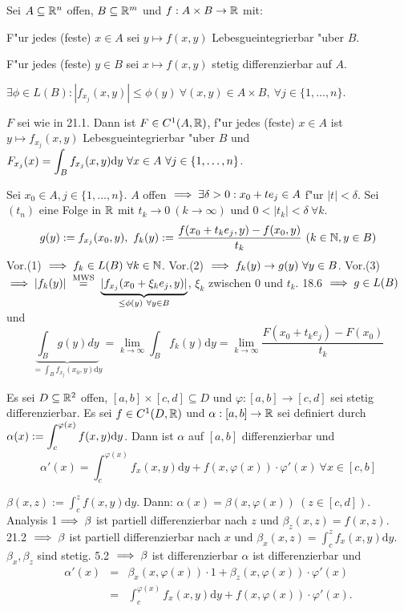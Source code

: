 \documentclass[a4paper,twoside,DIV15,BCOR12mm]{scrbook}
\begin{document}
\begin{satz}
Sei $A\subseteq \mathbb{R}^n$ offen, $B\subseteq\mathbb{R}^m$ und $f:A\times B\to\mathbb{R}$ mit:
\begin{liste}
\item F"ur jedes (feste) $x \in A$ sei $y\mapsto f(x,y)$ Lebesgueintegrierbar "uber $B$.
	\item F"ur jedes (feste) $y \in B$ sei $x\mapsto f(x,y)$ stetig differenzierbar auf $A$.
\item $\exists \phi\in L(B): |f_{x_j}(x,y)|\le\phi(y)\ \forall (x,y)\in A\times B,\ \forall j\in\{1,\ldots,n\}$.
\end{liste}
$F$ sei wie in 21.1. Dann ist $F\in C^1(A,\mathbb{R})$, f"ur jedes (feste) $x\in A$ ist $y\mapsto f_{x_j}(x,y)$ Lebesgueintegrierbar "uber $B$ und $F_{x_j}(x)=\displaystyle\int_B f_{x_j}(x,y)\text{d}y\ \forall x\in A\ \forall j\in \{1,\ldots,n\}$.
\end{satz}

\begin{beweis}
Sei $x_0\in A, j\in \{1,\ldots, n\}$. $A$ offen $\implies\exists \delta>0:x_0+te_j\in A$ f"ur $|t|<\delta$. Sei $(t_n)$ eine Folge in $\mathbb{R}$ mit $t_k\to 0\ (k\to\infty)$ und $0<|t_k|<\delta\ \forall k$.\\
\[g(y):=f_{x_j}(x_0, y),\ f_k(y):=\frac{f(x_0+t_ke_j,y)-f(x_0,y)}{t_k}\ (k\in \MdN, y\in B)\]
Vor.(1) $\folgt f_k\in L(B)\ \forall k\in \MdN$.
Vor.(2) $\implies f_k(y)\to g(y)\ \forall y\in B$.
Vor.(3) $\folgt |f_k(y)|\gleichnach{MWS}\underbrace{|f_{x_j}(x_0+\xi_ke_j,y)|}_{\le\phi(y)\ \forall y\in B}$, $\xi_k$ zwischen 0 und $t_k$.
18.6 $\implies g\in L(B)$ und 
\[\underbrace{\int_B g(y)dy}_{=\int_B f_{x_j}(x_0,y)\text{d}y}=\lim_{k\to\infty}\int_Bf_k(y)\text{d}y=\lim_{k\to\infty}\frac{F(x_0+t_ke_j)-F(x_0)}{t_k}\]
$ $
\end{beweis}

\begin{satz}
Es sei $D\subseteq\mathbb{R}^2$ offen, $[a,b]\times[c,d]\subseteq D$ und $\varphi:[a,b]\to[c,d]$ sei stetig differenzierbar. Es sei $f\in C^1(D,\mathbb{R})$ und $\alpha:[a,b]\to\mathbb{R}$ sei definiert durch $\alpha(x):=\displaystyle\int_c^{\varphi(x)}f(x,y)\text{d}y$.
Dann ist $\alpha$ auf $[a,b]$ differenzierbar und
\[
	\alpha'(x)=\int_c^{\varphi(x)}f_x(x,y)\text{d}y+f(x,\varphi(x))\cdot\varphi'(x)\ \forall x\in [c,b]
\]
\end{satz}

\begin{beweis}
$\beta(x,z):=\int_c^z f(x,y)\text{d}y$. Dann: $\alpha(x)=\beta(x,\varphi(x))\ (z\in[c,d])$.
Analysis 1$\implies \beta$ ist partiell differenzierbar nach $z$ und $\beta_z(x,z)=f(x,z)$.
21.2 $\implies \beta$ ist partiell differenzierbar nach $x$ und $\beta_x(x,z)=\int_c^z f_x(x,y)\text{d}y$. $\beta_x, \beta_z$ sind stetig.
5.2 $\implies \beta$ ist differenzierbar  $\alpha$ ist differenzierbar und 
\begin{eqnarray*}
\alpha'(x)&=&\beta_x(x,\varphi(x))\cdot 1 + \beta_z(x,\varphi(x))\cdot \varphi'(x)\\
&=&\int_c^{\varphi(x)}f_x(x,y)\text{d}y+f(x,\varphi(x))\cdot\varphi'(x).
\end{eqnarray*}
\end{beweis}
\end{document}
